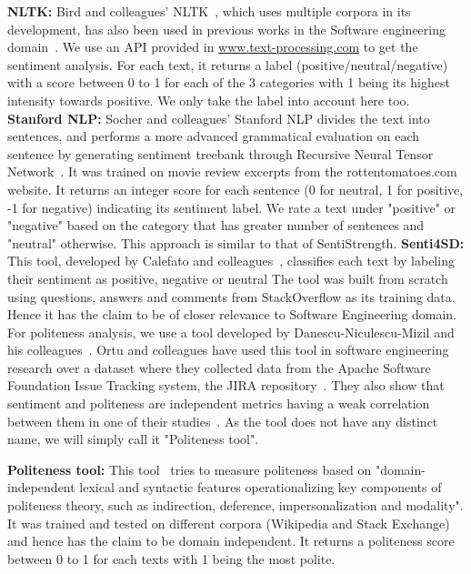 \newline
\indent\textbf{NLTK:} Bird and colleagues' NLTK~\cite{bird2009natural}, 
which uses multiple corpora in its development, 
has also been used in previous works 
in the Software engineering domain~\cite{pletea2014security,rousinopoulos2014sentiment}. 
We use an API provided in \href{www.text-processing.com}{www.text-processing.com} to get the sentiment analysis. For each text, it returns a label (positive/neutral/negative) with a score between 0 to 1 for each of the 3 categories with 1 being its highest intensity towards positive. We only take the label into account here too.
\newline
\indent\textbf{Stanford NLP:} Socher and colleagues' Stanford NLP 
divides the text into sentences, 
and performs a more advanced grammatical evaluation 
on each sentence 
by generating sentiment treebank 
through Recursive Neural Tensor Network~\cite{socher2013recursive}.
It was trained on movie review excerpts 
from the rottentomatoes.com website. 
It returns an integer score for each sentence (0 for neutral, 1 for positive, -1 for negative) indicating its sentiment label. We rate a text under "positive" or "negative" based on the category that has greater number of sentences and "neutral" otherwise. This approach is similar to that of SentiStrength.
\newline
\indent\textbf{Senti4SD:} This tool, 
developed by Calefato and colleagues~\cite{calefato2017sentiment}, classifies each text by labeling their sentiment 
as positive, negative or neutral 
The tool was built
from scratch using 
questions, answers and comments 
from StackOverflow as its training data. 
Hence it has the claim to be of closer relevance to Software Engineering domain.
\newline
\newline
For politeness analysis, we use a tool developed by Danescu-Nicu\-lescu-Mizil and his colleagues~\cite{danescu2013computational}. Ortu and colleagues have used this tool in software engineering research over a dataset where they collected data from the Apache Software Foundation Issue Tracking system, the JIRA repository~\cite{ortu2015would,ortu2015bullies}. They also show that sentiment and politeness are independent metrics having a weak correlation between them in one of their studies~\cite{ortu2015bullies}. As the tool does not have any distinct name, we will simply call it "Politeness tool". 

\textbf{Politeness tool:} This tool~\cite{danescu2013computational} tries to measure politeness based on "domain-independent lexical and syntactic features operationalizing key components of politeness theory, such as indirection, deference, impersonalization and modality". 
It was trained and tested 
on different corpora (Wikipedia and Stack Exchange) 
and hence has the claim to be domain independent. 
It returns a politeness score between 0 to 1 for each texts with 1 being the most polite.  

